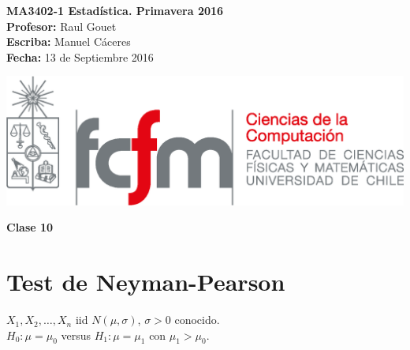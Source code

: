 \documentclass[10pt]{article}
\theoremstyle{plain}
\theoremstyle{definition}
\newcommand{\catnum}{10} %
\newcommand{\fecha}{13 de Septiembre 2016 }
\begin{document}
\vspace*{-1.2 cm}
\begin{minipage}{0.6\textwidth}
\begin{flushleft}
\hspace*{-0.5cm}\textbf{MA3402-1 Estadística. Primavera 2016}\\
\hspace*{-0.5cm}\textbf{Profesor:} Raul Gouet\\
\hspace*{-0.5cm}\textbf{Escriba:} Manuel Cáceres\\
\hspace*{-0.5cm}\textbf{Fecha:} \fecha
\end{flushleft}
\end{minipage}
\begin{minipage}{0.36\textwidth}
\begin{flushright}
\includegraphics[scale=0.3]{imagenes/fcfm_dcc}
\end{flushright}
\end{minipage}
\bigskip

\begin{center}
\LARGE\textbf{Clase \catnum}
\end{center}
\section{Test de Neyman-Pearson}
$X_{1}, X_{2}, \ldots, X_{n}$ iid $N(\mu,\sigma)$, $\sigma>0$ conocido.\\
$H_{0}: \mu = \mu_{0}$ versus $H_{1}: \mu = \mu_{1}$ con $\mu_{1}>\mu_{0}$.\\
\end{document}
